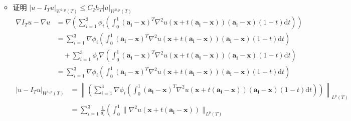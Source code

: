 \documentclass[a4paper]{article}
\begin{document}
\begin{enumerate}
\begin{itemize}
\begin{equation}
\begin{aligned}
                            \end{aligned}
                        \end{equation}              
                    \item 证明 $|u-I_T u|_{W^{1,p}(T)} \leq C_2 h_T |u|_{W^{2,p}(T)}$                    
                        \begin{equation}
                            \begin{aligned}
                                \nabla I_T u - \nabla u
                                &= \nabla \left( \sum_{i=1}^{3}\phi_i \left( \int_{0}^{1
                                } (\bm{a_i} - \bm{x})^T \nabla^2 u(\bm{x} + t(\bm{a_i} - \bm{x})) (\bm{a_i
                                } - \bm{x})(1-t) \text{d}t \right) \right)\\
                                &= \sum_{i=1}^{3} \nabla \phi_i \left( \int_{0}^{1
                                } (\bm{a_i} - \bm{x})^T \nabla^2 u(\bm{x} + t(\bm{a_i} - \bm{x})) (\bm{a_i
                                } - \bm{x})(1-t) \text{d}t \right)\\
                                &\quad + \sum_{i=1}^{3}\phi_i 
                                \nabla \left( \int_{0}^{1
                                } (\bm{a_i} - \bm{x})^T \nabla^2 u(\bm{x} + t(\bm{a_i} - \bm{x})) (\bm{a_i
                                } - \bm{x})(1-t) \text{d}t \right)\\
                                &= \sum_{i=1}^{3} \nabla \phi_i \left( \int_{0}^{1
                                } (\bm{a_i} - \bm{x})^T \nabla^2 u(\bm{x} + t(\bm{a_i} - \bm{x})) (\bm{a_i
                                } - \bm{x})(1-t) \text{d}t \right)
                            \end{aligned}
                        \end{equation}
                        \begin{equation}
                            \begin{aligned}
                                |u-I_T u|_{W^{1,p}(T)}
                                &= \left\|  \left( \sum_{i=1}^{3}\nabla\phi_i \left( \int_{0}^{1
                                } (\bm{a_i} - \bm{x})^T \nabla^2 u(\bm{x} + t(\bm{a_i} - \bm{x})) (\bm{a_i
                                } - \bm{x})(1-t) \text{d}t \right) \right) \right\| _{L^p(T)}\\
                                &= \sum_{i=1}^{3}\frac{1}{d_i} \left( \int_{0}^{1
                                } \lVert \nabla^2 u(\bm{x} + t(\bm{a_i} - \bm{x})) \rVert _{L^p(T)}

\end{aligned}
\end{equation}
\end{itemize}
\end{enumerate}
\end{document}
